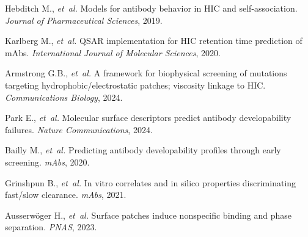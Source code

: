 \documentclass[11pt]{article}
\begin{document}
\begin{thebibliography}{99}
Hebditch M., \emph{et~al.} Models for antibody behavior in HIC and self-association. \emph{Journal of Pharmaceutical Sciences}, 2019.

Karlberg M., \emph{et~al.} QSAR implementation for HIC retention time prediction of mAbs. \emph{International Journal of Molecular Sciences}, 2020.

Armstrong G.B., \emph{et~al.} A framework for biophysical screening of mutations targeting hydrophobic/electrostatic patches; viscosity linkage to HIC. \emph{Communications Biology}, 2024.

Park E., \emph{et~al.} Molecular surface descriptors predict antibody developability failures. \emph{Nature Communications}, 2024.

Bailly M., \emph{et~al.} Predicting antibody developability profiles through early screening. \emph{mAbs}, 2020.

Grinshpun B., \emph{et~al.} In vitro correlates and in silico properties discriminating fast/slow clearance. \emph{mAbs}, 2021.

Ausserwöger H., \emph{et~al.} Surface patches induce nonspecific binding and phase separation. \emph{PNAS}, 2023.

\end{thebibliography}
\end{document}
